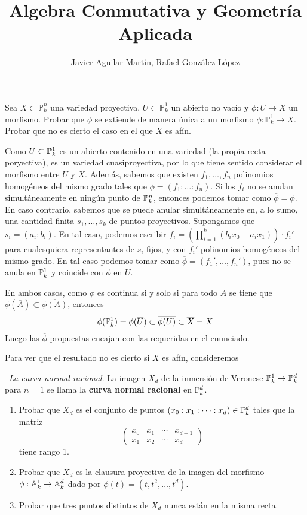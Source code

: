 \documentclass[twoside]{article}
\begin{document}
\title{Algebra Conmutativa y Geometría Aplicada}
\author{Javier Aguilar Martín, Rafael González López}
\maketitle
\begin{ejercicio}{2} Sea $X \subset \mathbb{P}^n_k$ una variedad proyectiva, $U\subset \mathbb{P}^1_k$ un abierto no vacío y $\phi\colon U\rightarrow X$ un morfismo. Probar que $\phi$ se extiende de manera única a un morfismo $\overline{\phi}\colon \mathbb{P}^1_k\rightarrow X$. Probar que no es cierto el caso en el que $X$ es afín.
\end{ejercicio}
\begin{solucion}
Como $U\subset \mathbb{P}^1_k$ es un abierto contenido en una variedad (la propia recta poryectiva), es un variedad cuasiproyectiva, por lo que tiene sentido considerar el morfismo entre $U$ y $X$. Además, sabemos que existen $f_1,\dotsc,f_n$ polinomios homogéneos del mismo grado tales que $\phi = (f_1 : \dotsc : f_n)$. Si los $f_i$ no se anulan simultáneamente en ningún punto de $\mathbb{P}^n_k $, entonces podemos tomar como $\overline{\phi}=\phi$. En caso contrario, sabemos que se puede anular simultáneamente en, a lo sumo, una cantidad finita $s_1,\dotsc,s_k$ de puntos proyectivos. Supongamos que $s_i = (a_i:b_i)$. En tal caso, podemos escribir $f_i = \left(\prod_{i=1}^k (b_ix_0-a_ix_1)\right)\cdot f_i'$ para cualesquiera representantes de $s_i$ fijos, y con $f_i'$ polinomios homogéneos del mismo grado. En tal caso podemos tomar como $\overline{\phi}=(f_1',\dotsc,f_n')$, pues no se anula en $\mathbb{P}^1_k $ y coincide con $\phi$ en $U$. 

En ambos casos, como $\phi$ es continua si y solo si para todo $A$ se tiene que $\phi(\overline{A})\subset \overline{\phi(A)}$, entonces $$\phi(\mathbb{P}^1_k)=\phi(\overline{U})\subset \overline{\phi(U)}\subset \overline{X} = X$$
Luego las $\overline{\phi}$ propuestas encajan con las requeridas en el enunciado. 

Para ver que el resultado no es cierto si $X$ es afín, consideremos 
\end{solucion}
\newpage 
\begin{ejercicio}{5}\
\emph{La curva normal racional}. La imagen $X_d$ de la inmersión de
Veronese $\mathbb{P}^1_k \to \mathbb{P}^d_k$ para $n = 1$ se llama la \textbf{curva normal racional} en $\mathbb{P}^d_k$.
\begin{enumerate}
\item Probar que $X_d$ es el conjunto de puntos $(x_0 : x_1 : \dots : x_d) \in \mathbb{P}^d_k$ tales que
la matriz 
\[
\begin{pmatrix}
x_0 & x_1 &\cdots& x_{d-1}\\
x_1 & x_2 &\cdots& x_d
\end{pmatrix}
\]
tiene rango 1.
\item Probar que $X_d$ es la clausura proyectiva de la imagen del morfismo $\phi :\mathbb{A}^1_k \to \mathbb{A}^d_k$ dado por $\phi(t) = (t, t^2, \dots , t^d)$.
\item Probar que tres puntos distintos de $X_d$ nunca están en la misma recta.
\end{enumerate}
\end{ejercicio}
\end{document}
